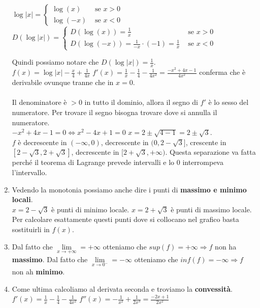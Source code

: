 \begin{example}
\begin{enumerate}
    $\log|x| = \begin{cases}\log(x) & \text{ se } x>0 \\ \log(-x) & \text{ se } x<0\end{cases}$\hfill
    $D(\log|x|) = \begin{cases}D(\log(x)) = \frac{1}{x} & \text{ se } x>0 \\D(\log(-x)) = \frac{1}{-x} \cdot (-1) = \frac{1}{x} & \text{ se } x<0\end{cases}$
    
    Quindi possiamo notare che $D(\log |x|) = \frac{1}{x}$.\\
    $f(x) = \log|x| - \frac{x}{4} + \frac{1}{4x}$ \hspace{.3cm} $f'(x) = \frac{1}{x} - \frac{1}{4} -\frac{1}{4x^2} = \frac{-x^2 + 4x -1}{4x^2}$ conferma che è derivabile ovunque tranne che in $x = 0$.\\\\
    Il denominatore è $> 0$ in tutto il dominio, allora il segno di $f'$ è lo sesso del numeratore. Per trovare il segno bisogna trovare dove si annulla il numeratore.\\
    $-x^2 + 4x - 1 = 0 \Longleftrightarrow x^2 - 4x + 1 = 0$ \hspace{.3cm} $x = 2 \pm \sqrt{4-1} = 2 \pm \sqrt{3}$.\\
    $f$ è decrescente in $(-\infty,0)$, decrescente in $(0,2-\sqrt{3}]$, crescente in $[2-\sqrt{3}, 2+\sqrt{3}]$, decrescente in $[2+\sqrt{3},+\infty)$. Questa separazione va fatta perché il teorema di Lagrange prevede intervalli e lo 0 interrompeva l'intervallo.
    \item Vedendo la monotonia possiamo anche dire i punti di \textbf{massimo e minimo locali}. \\
    $x = 2 - \sqrt{3}$ è punti di minimo locale. \hspace{.3cm} $x = 2 + \sqrt{3}$ è punti di massimo locale.\\
    Per calcolare esattamente questi punti dove si collocano nel grafico basta sostituirli in $f(x)$.
    \item Dal fatto che $\lim\limits_{x\to +\infty} = +\infty$ otteniamo che $sup(f) = +\infty \Longrightarrow f$ non ha \textbf{massimo}. Dal fatto che $\lim\limits_{x\to 0^-}=-\infty$ otteniamo che $inf(f) = -\infty \Longrightarrow f$ non ah \textbf{minimo}.
    \item Come ultima calcoliamo al derivata seconda e troviamo la \textbf{convessità}.\\
    $f'(x) = \frac{1}{x} - \frac{1}{4} - \frac{1}{4x^2}$ \hspace{.5cm} $f''(x) = -\frac{1}{x^2} +\frac{1}{2x^3} = \frac{-2x + 1}{2x^2}$\\

\end{enumerate}
\end{example}
